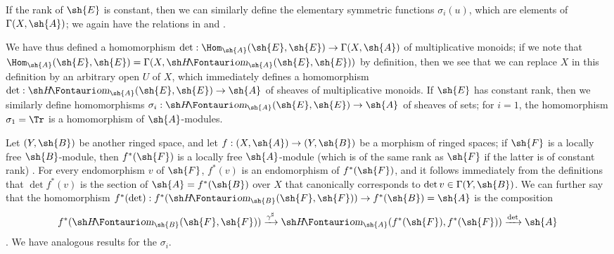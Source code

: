 \begin{env}[6.4.8]
If the rank of $\sh{E}$ is constant, then we can similarly define the elementary symmetric functions $\sigma_i(u)$, which are elements of $\Gamma(X,\sh{A})$;
we again have the relations in  and .

We have thus defined a homomorphism $\det:\Hom_{\sh{A}}(\sh{E},\sh{E})\to\Gamma(X,\sh{A})$ of multiplicative monoids;
if we note that $\Hom_{\sh{A}}(\sh{E},\sh{E})=\Gamma(X,\shHom_{\sh{A}}(\sh{E},\sh{E}))$ by definition, then we see that we can replace $X$ in this definition by an arbitrary open $U$ of $X$, which immediately defines a homomorphism $\det:\shHom_{\sh{A}}(\sh{E},\sh{E})\to\sh{A}$ of sheaves of multiplicative monoids.
If $\sh{E}$ has constant rank, then we similarly define homomorphisms $\sigma_i:\shHom_{\sh{A}}(\sh{E},\sh{E})\to\sh{A}$ of sheaves of sets;
for $i=1$, the homomorphism $\sigma_1=\Tr$ is a homomorphism of $\sh{A}$-modules.

Let $(Y,\sh{B})$ be another ringed space, and let $f:(X,\sh{A})\to(Y,\sh{B})$ be a morphism of ringed spaces;
if $\sh{F}$ is a locally free $\sh{B}$-module, then $f^*(\sh{F})$ is a locally free $\sh{A}$-module (which is of the same rank as $\sh{F}$ if the latter is of constant rank) .
For every endomorphism $v$ of $\sh{F}$, $f^*(v)$ is an endomorphism of $f^*(\sh{F})$, and it follows immediately from the definitions that $\det f^*(v)$ is the section of $\sh{A}=f^*(\sh{B})$ over $X$ that canonically corresponds to $\det v\in\Gamma(Y,\sh{B})$.
We can further say that the homomorphism $f^*(\det):f^*(\shHom_{\sh{B}}(\sh{F},\sh{F}))\to f^*(\sh{B})=\sh{A}$ is the composition
\[
  f^*(\shHom_{\sh{B}}(\sh{F},\sh{F}))
  \xrightarrow{\gamma^\sharp} \shHom_{\sh{A}}(f^*(\sh{F}),f^*(\sh{F}))
  \xrightarrow{\det} \sh{A}
\]
.
We have analogous results for the $\sigma_i$.
\end{env}

